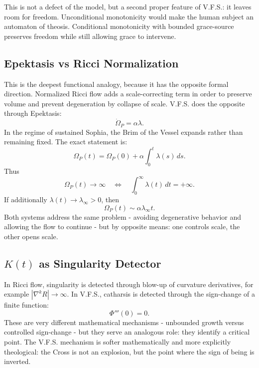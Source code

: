 \documentclass[11pt]{article}
\newcommand{\VFS}{V.F.S.}
\newcommand{\Om}{\Omega_P}
\begin{document}
This is not a defect of the model, but a second proper feature of \VFS{}: it leaves room for freedom. Unconditional monotonicity would make the human subject an automaton of theosis. Conditional monotonicity with bounded grace-source preserves freedom while still allowing grace to intervene.

\subsection{Epektasis vs Ricci Normalization}

This is the deepest functional analogy, because it has the opposite formal direction. Normalized Ricci flow adds a scale-correcting term in order to preserve volume and prevent degeneration by collapse of scale. \VFS{} does the opposite through Epektasis:
\begin{equation}
\dot\Om=\alpha\lambda.
\end{equation}
In the regime of sustained Sophia, the Brim of the Vessel expands rather than remaining fixed. The exact statement is:
\begin{equation}
\Om(t)=\Om(0)+\alpha\int_0^t\lambda(s)\,ds.
\end{equation}
Thus
\begin{equation}
\Om(t)\to\infty
\quad\Longleftrightarrow\quad
\int_0^\infty\lambda(t)\,dt=+\infty.
\end{equation}
If additionally $\lambda(t)\to\lambda_\infty>0$, then
\begin{equation}
\Om(t)\sim \alpha\lambda_\infty t.
\end{equation}
Both systems address the same problem - avoiding degenerative behavior and allowing the flow to continue - but by opposite means: one controls scale, the other opens scale.

\subsection{$K(t)$ as Singularity Detector}

In Ricci flow, singularity is detected through blow-up of curvature derivatives, for example $|\nabla^k R|\to\infty$. In \VFS{}, catharsis is detected through the sign-change of a finite function:
\begin{equation}
\Phi'''(0)=0.
\end{equation}
These are very different mathematical mechanisms - unbounded growth versus controlled sign-change - but they serve an analogous role: they identify a critical point. The \VFS{} mechanism is softer mathematically and more explicitly theological: the Cross is not an explosion, but the point where the sign of being is inverted.
\end{document}
